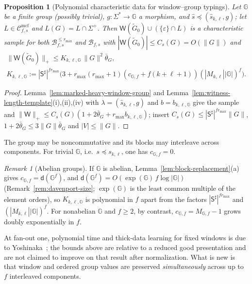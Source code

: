 \documentclass[11pt]{article}
\numberwithin{equation}{section}
\theoremstyle{plain}
\newtheorem{proposition}[theorem]{Proposition}
\theoremstyle{definition}
\theoremstyle{remark}
\newtheorem{remark}[theorem]{Remark}
\newcommand{\Wit}{\mathsf{W}}
\newcommand{\Cmcf}[2]{\mathcal{C}^{\mathrm{mcf}}_{#1,#2}}
\newcommand{\eps}{\varepsilon}
\theoremstyle{plain}
\begin{document}
\begin{proposition}[Polynomial characteristic data for window--group typings]
\label{thm:window-group-polydata}
Let ${\mathbb G}$ be a finite group (possibly trivial), $g:\Sigma^*\to {\mathbb G}$ a morphism, and
$\widehat s\preceq(\widehat s_{k,\ell},g)$; let $L\in\Cmcf{f}{s}$ and
$L(G)=L\cap\Sigma^+$.  Then $\Wit(\widetilde G_0)\cup(\{\eps\}\cap L)$ is a
characteristic sample for both $\mathcal B^{\le r_{\max}}_{f,s}$ and
$\mathcal B_{f,s}$ with $|\Wit(\widetilde G_0)|\le C_s(G)=O(\|G\|)$ and
\[
 \begin{gathered}
 \|\Wit(\widetilde G_0)\|_+\le K_{k,\ell,{\mathbb G}}\,\|G\|^2\bar\theta_G,\\
 K_{k,\ell,{\mathbb G}}:=|\mathsf S^\sharp|^{fr_{\max}}
 \bigl(3+r_{\max}(r_{\max}+1)(c_{{\mathbb G},f}+f(k+\ell+1))(|M_{k,\ell}||{\mathbb G}|)^f\bigr).
 \end{gathered}
\]
\end{proposition}

\begin{proof}
Lemma~\ref{lem:marked-heavy-window-group} and
Lemma~\ref{lem:witness-length-template}(i),(ii),(iv) with
$\lambda=(\widehat s_{k,\ell},g)$ and $b=b_{k,\ell,{\mathbb G}}$ give the sample and
$\|\Wit\|_+\le C_s(G)(1+2\bar\theta_G+r_{\max}b_{k,\ell,{\mathbb G}})$; insert
$C_s(G)\le|\mathsf S^\sharp|^{fr_{\max}}\|G\|$, $1+2\bar\theta_G\le3\|G\|\bar\theta_G$ and
$|V|\le\|G\|$.
\end{proof}

The group may be noncommutative and its blocks may interleave across components.
For trivial ${\mathbb G}$, i.e.\ $s\preceq s_{k,\ell}$, one has $c_{{\mathbb G},f}=0$.

\begin{remark}[Abelian groups]
\label{rem:window-abelian}
If ${\mathbb G}$ is abelian, Lemma~\ref{lem:block-replacement}(a) gives
$c_{{\mathbb G},f}=\mathsf d({\mathbb G}^f)$, and
$\mathsf d({\mathbb G}^f)=O(\exp({\mathbb G})\,f\log|{\mathbb G}|)$
(Remark~\ref{rem:davenport-size}; $\exp({\mathbb G})$ is the least common multiple of
the element orders), so $K_{k,\ell,{\mathbb G}}$ is polynomial in $f$ apart from the factors
$|\mathsf S^\sharp|^{fr_{\max}}$ and $(|M_{k,\ell}||{\mathbb G}|)^f$.  For nonabelian
${\mathbb G}$ and $f\ge2$, by contrast, $c_{{\mathbb G},f}=M_{{\mathbb G},f}-1$ grows doubly exponentially in $f$.
\end{remark}

At fan-out one, polynomial time and thick-data learning for fixed windows is due
to Yoshinaka~\cite[Theorem~1]{Yoshinaka2008}; the bounds above are relative to a
reduced good presentation and are not claimed to improve on that result after
normalization.  What is new is that window and ordered group values are preserved
\emph{simultaneously} across up to $f$ interleaved components.
\end{document}
